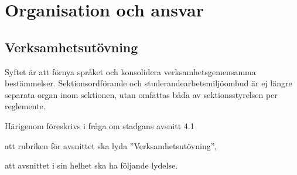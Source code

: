\documentclass{article}
\begin{document}
\section{Organisation och ansvar}
\subsection{Verksamhetsutövning}
Syftet är att förnya språket och konsolidera verksamhetsgemensamma bestämmelser.
Sektionsordförande och studerandearbetsmiljöombud är ej längre separata organ inom sektionen, utan omfattas båda av sektionsstyrelsen per reglemente.

Härigenom föreskrivs i fråga om stadgans avsnitt 4.1
\begin{dels}
    \item att rubriken för avsnittet ska lyda ''Verksamhetsutövning'',
    \item att avsnittet i sin helhet ska ha följande lydelse.
\end{dels}
\end{document}
